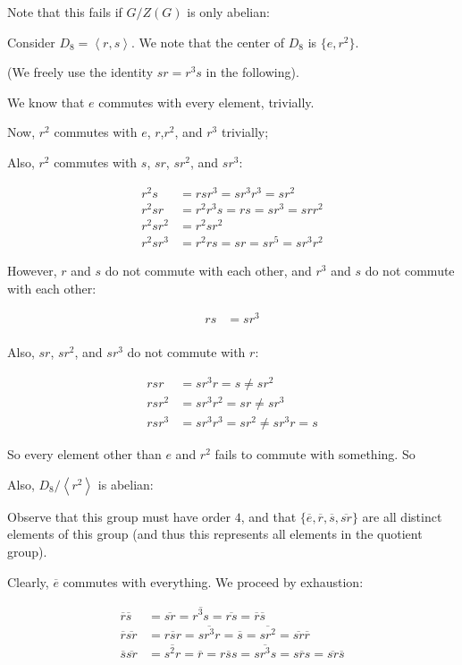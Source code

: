 \documentclass[a4paper,12pt]{article}
\newcommand{\tab}{\hspace{4mm}} %
\newcommand{\anbrack}[1]{\left\langle #1 \right\rangle}
\begin{document}
Note that this fails if $G/Z(G)$ is only abelian:

\tab Consider $D_8=\anbrack{r,s}$. We note that the center of $D_8$ is $\{e,r^2\}$.

\tab (We freely use the identity $sr = r^3s$ in the following).

\tab \tab We know that $e$ commutes with every element, trivially.

\tab \tab Now, $r^2$ commutes with $e$, $r$,$r^2$, and $r^3$ trivially; %

\tab \tab Also, $r^2$ commutes with $s$, $sr$, $sr^2$, and $sr^3$:

\begin{align*}
r^2s &= rsr^3 = sr^3r^3 = sr^2\\
r^2sr &= r^2r^3s = rs = sr^3 = srr^2 \\ 
r^2sr^2 &= r^2sr^2\\
r^2sr^3 &= r^2rs = sr = sr^5=sr^3r^2
\end{align*}

\tab \tab However, $r$ and $s$ do not commute with each other, and $r^3$ and $s$ do not commute with each other:

\begin{align*}
rs &= sr^3\\
\end{align*}

\tab \tab Also, $sr$, $sr^2$, and $sr^3$ do not commute with $r$:

\begin{align*}
rsr &= sr^3r = s \neq sr^2\\
rsr^2 &= sr^3r^2 = sr \neq sr^3 \\
rsr^3 &= sr^3r^3 = sr^2 \neq sr^3r = s
\end{align*}

\tab \tab So every element other than $e$ and $r^2$ fails to commute with something.
So 

\tab Also, $D_8/\anbrack{r^2}$ is abelian:

\tab \tab Observe that this group must have order $4$, and that $\{\overline{e},\overline{r}, \overline{s}, \overline{sr}\}$ are all distinct elements of this group (and thus this represents all elements in the quotient group).

\tab \tab Clearly, $\overline{e}$ commutes with everything. We proceed by exhaustion:

\begin{align*}
\overline{r}\overline{s} &= \overline{sr} = \overline{r^3s} = \overline{rs} = \overline{r}\overline{s}\\
\overline{r}\overline{sr} &= \overline{rsr} = \overline{sr^3r} = \overline{s} = \overline{sr^2} = \overline{sr}\overline{r}\\
\overline{s}\overline{sr} &= \overline{s^2r} = \overline{r} = \overline{rss} = \overline{sr^3s} = \overline{srs} = \overline{sr}\overline{s}\\
\end{align*}
\end{document}

